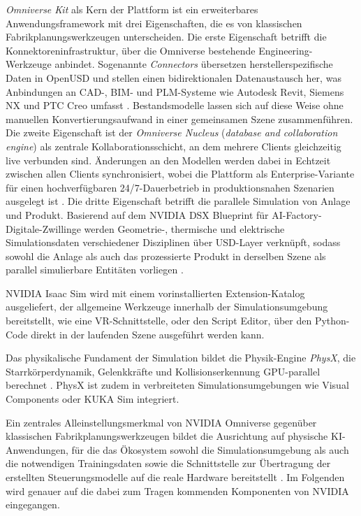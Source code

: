 \emph{Omniverse Kit} als Kern der Plattform ist ein erweiterbares
Anwendungsframework mit drei Eigenschaften, die es von klassischen
Fabrikplanungswerkzeugen unterscheiden.
Die erste Eigenschaft betrifft die Konnektoreninfrastruktur, über die Omniverse bestehende
Engineering-Werkzeuge anbindet.
Sogenannte \emph{Connectors} übersetzen herstellerspezifische Daten in OpenUSD und stellen
einen bidirektionalen Datenaustausch her, was Anbindungen an \mbox{CAD-,} BIM- und
PLM-Systeme wie Autodesk Revit, Siemens NX und PTC Creo umfasst
\cite{nvidia_omniverse_connectors}.
Bestandsmodelle lassen sich auf diese Weise ohne manuellen Konvertierungsaufwand in einer
gemeinsamen Szene zusammenführen.
Die zweite Eigenschaft ist der \emph{Omniverse Nucleus} (\emph{database and collaboration
engine}) als zentrale Kollaborationsschicht, an dem mehrere Clients gleichzeitig live
verbunden sind.
Änderungen an den Modellen werden dabei in Echtzeit zwischen allen Clients synchronisiert,
wobei die Plattform als Enterprise-Variante für einen hochverfügbaren 24/7-Dauerbetrieb
in produktionsnahen Szenarien ausgelegt ist \cite{nvidia_nucleus_arch}.
Die dritte Eigenschaft betrifft die parallele Simulation von Anlage und Produkt.
Basierend auf dem NVIDIA DSX Blueprint für AI-Factory-Digitale-Zwillinge werden Geometrie-,
thermische und elektrische Simulationsdaten verschiedener Disziplinen über
USD-Layer verknüpft, sodass sowohl die Anlage als auch das prozessierte Produkt in
derselben Szene als parallel simulierbare Entitäten vorliegen
\cite{nvidia_omniverse,nvidia_isaacsim}.

NVIDIA Isaac Sim wird mit einem vorinstallierten Extension-Katalog ausgeliefert, der
allgemeine Werkzeuge innerhalb der Simulationsumgebung bereitstellt, wie eine
VR-Schnittstelle, oder den Script Editor, über den Python-Code direkt in der
laufenden Szene ausgeführt werden kann.

Das physikalische Fundament der Simulation bildet die Physik-Engine \emph{PhysX},
die Starrkörperdynamik, Gelenkkräfte und Kollisionserkennung GPU-parallel berechnet
\cite{nvidia_physx}.
PhysX ist zudem in verbreiteten Simulationsumgebungen wie Visual Components oder
KUKA Sim integriert.

Ein zentrales Alleinstellungsmerkmal von NVIDIA Omniverse gegenüber klassischen
Fabrikplanungswerkzeugen bildet die Ausrichtung auf physische KI-Anwendungen, für die
das Ökosystem sowohl die Simulationsumgebung als auch die notwendigen Trainingsdaten
sowie die Schnittstelle zur Übertragung der erstellten Steuerungsmodelle auf die
reale Hardware bereitstellt \cite{nvidia_omniverse}.
Im Folgenden wird genauer auf die dabei zum Tragen kommenden Komponenten von
NVIDIA eingegangen.

